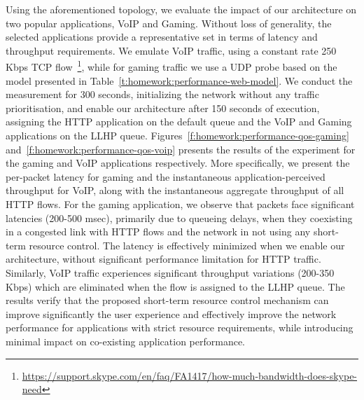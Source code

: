Using the aforementioned topology, we evaluate the impact of our architecture on
two popular applications, VoIP and Gaming. Without loss of generality, the
selected applications provide a representative set in terms of  latency and
throughput requirements.  We emulate VoIP traffic, using a constant rate 250
Kbps TCP
flow~\footnote{\url{https://support.skype.com/en/faq/FA1417/how-much-bandwidth-does-skype-need}},
while for gaming traffic we use a UDP probe based on the model presented in
Table~\ref{t:homework:performance-web-model}. We conduct the measurement for 300
seconds, initializing the network without any traffic prioritisation, and enable
our architecture after 150 seconds of execution, assigning the HTTP application
on the default queue and the VoIP and Gaming applications on the LLHP queue.
Figures~\ref{f:homework:performance-qos-gaming} and~\ref{f:homework:performance-qos-voip} presents the results of the experiment for
the gaming and VoIP applications respectively. More specifically, we present the
per-packet latency for gaming and the instantaneous application-perceived
throughput for VoIP, along with the instantaneous aggregate throughput of all
HTTP flows. For the gaming application, we observe that packets face significant
latencies (200-500 msec), primarily due to  queueing delays, when they
coexisting in a congested link with HTTP flows and the network in not using any
short-term resource control. The latency is effectively minimized when we enable
our architecture, without significant performance limitation for HTTP traffic.
Similarly, VoIP traffic experiences significant throughput variations (200-350
Kbps) which are eliminated when the flow is assigned to the LLHP queue.  The
results verify that the proposed short-term resource control mechanism can
improve significantly the user experience and effectively improve the network
performance for applications with strict resource requirements, while
introducing minimal impact on co-existing application performance. 

